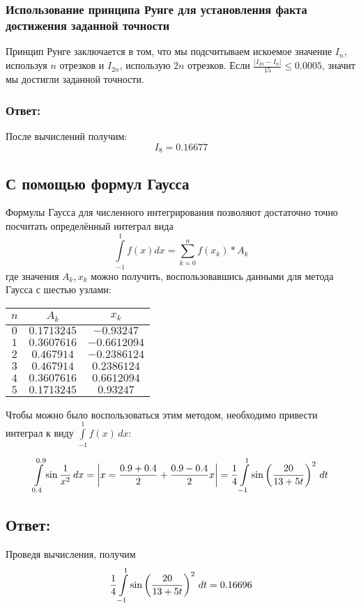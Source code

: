 \documentclass[a4paper,10pt,notitlepage,pdftex,headsepline]{scrartcl}
\begin{document}
\subsubsection{Использование принципа Рунге для установления факта достижения заданной точности}
Принцип Рунге заключается в том, что мы подсчитываем искоемое значение $I_n$, используя $n$ отрезков и $I_{2n}$, использую $2n$ отрезков.
Если $\frac{\left|I_{2n}-I_n\right|}{15} \leqslant 0.0005$, значит мы достигли заданной точности.

\subsubsection{Ответ:}
После вычислений получим:
$$ I_8 = 0.16677$$
\subsection{С помощью формул Гаусса}
Формулы Гаусса для численного интегрирования позволяют достаточно точно посчитать определённый интеграл вида $$\int\limits_{-1}^1 f\left(x\right) dx = \sum\limits_{k=0}^{n} f\left(x_k\right) * A_k$$
где значения $A_k, x_k$ можно получить, воспользовавшись данными для метода Гаусса с шестью узлами:

\begin{tabular}{|c|c|c|}
\hline
$n$ & $A_k$ & $x_k$\\
\hline
$0$ & $0.1713245$ & $-0.93247$\\
$1$ & $0.3607616$ & $-0.6612094$\\
$2$ & $0.467914$ & $-0.2386124$\\
$3$ & $0.467914$ & $0.2386124$\\
$4$ & $0.3607616$ & $0.6612094$\\
$5$ & $0.1713245$ & $0.93247$\\
\hline
\end{tabular}

Чтобы можно было воспользоваться этим методом, необходимо привести интеграл к виду $\int\limits_{-1}^1 f\left(x\right)\,dx$:

$$\int\limits_{0.4}^{0.9} \sin\frac{1}{x^2}\,dx = \left| x = \frac{0.9 + 0.4}{2} + \frac{0.9-0.4}{2} x \right| =
\frac{1}{4}\int\limits_{-1}^{1}\sin\left(\strut \frac{20}{13+5t}\right)^2\,dt$$

\subsection{Ответ:}
Проведя вычисления, получим
$$\frac{1}{4}\int\limits_{-1}^1\sin\left(\strut \frac{20}{13+5t}\right)^2\,dt = 0.16696$$
\end{document}
